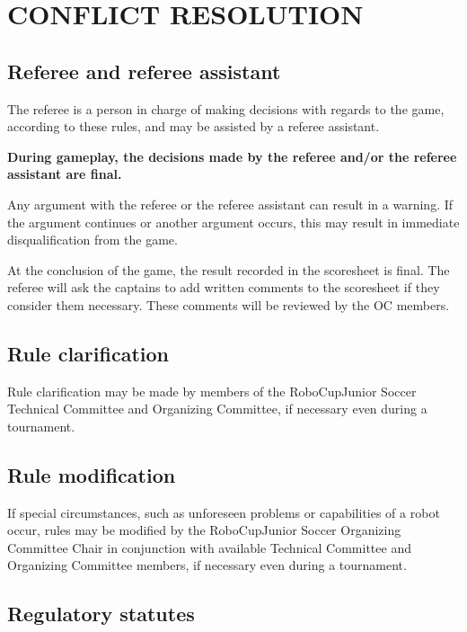 \documentclass{article}
\begin{document}
\section{CONFLICT RESOLUTION \label{ref-047}}

\subsection{Referee and referee assistant \label{ref-048}}

The referee is a person in charge of making decisions with regards to the game,
according to these rules, and may be assisted by a referee assistant.

\textbf{During gameplay, the decisions made by the referee and/or the referee assistant are final.}

Any argument with the referee or the referee assistant can result in a warning.
If the argument continues or another argument occurs, this may result in
immediate disqualification from the game.

At the conclusion of the game, the result recorded in the scoresheet is final.
The referee will ask the captains to add written comments to the scoresheet if
they consider them necessary. These comments will be reviewed by the OC
members.

\subsection{Rule clarification \label{ref-049}}

Rule clarification may be made by members of the RoboCupJunior Soccer Technical
Committee and Organizing Committee, if necessary even during a tournament.

\subsection{Rule modification \label{ref-050}}

If special circumstances, such as unforeseen problems or capabilities of a
robot occur, rules may be modified by the RoboCupJunior Soccer Organizing
Committee Chair in conjunction with available Technical Committee and
Organizing Committee members, if necessary even during a tournament.

\subsection{Regulatory statutes \label{ref-051}}
\end{document}
